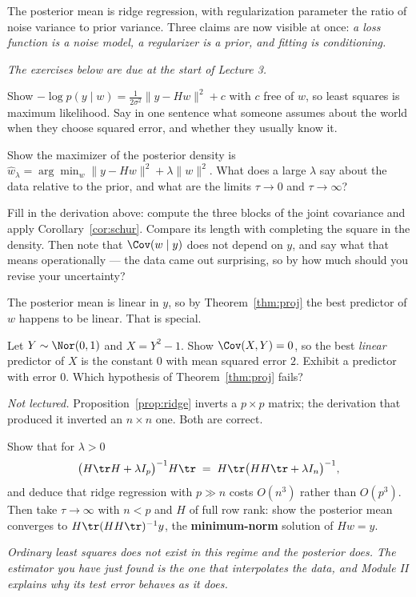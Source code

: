 \documentclass[11pt]{article}
\begin{document}
The posterior mean is ridge regression, with regularization parameter the ratio of noise variance to prior variance. Three claims are now visible at once: \emph{a loss function is a noise model, a regularizer is a prior, and fitting is conditioning.}

\emph{The exercises below are due at the start of Lecture 3.}

\begin{exercise}[\ty{A}]
Show $-\log p(y\mid w)=\frac{1}{2\sigma^2}\|y-Hw\|^2+c$ with $c$ free of $w$, so least squares is maximum likelihood. Say in one sentence what someone assumes about the world when they choose squared error, and whether they usually know it.
\end{exercise}

\begin{exercise}[\ty{A}]
Show the maximizer of the posterior density is $\widehat w_\lambda=\arg\min_w\|y-Hw\|^2+\lambda\|w\|^2$. What does a large $\lambda$ say about the data relative to the prior, and what are the limits $\tau\to0$ and $\tau\to\infty$?
\end{exercise}

\begin{exercise}[\ty{B}]
Fill in the derivation above: compute the three blocks of the joint covariance and apply Corollary~\ref{cor:schur}. Compare its length with completing the square in the density. Then note that $\Cov(w\mid y)$ does not depend on $y$, and say what that means operationally --- the data came out surprising, so by how much should you revise your uncertainty?
\end{exercise}

The posterior mean is linear in $y$, so by Theorem~\ref{thm:proj} the best predictor of $w$ happens to be linear. That is special.

\begin{exercise}[\ty{B}]
Let $Y\sim\Nor(0,1)$ and $X=Y^2-1$. Show $\Cov(X,Y)=0$, so the best \emph{linear} predictor of $X$ is the constant $0$ with mean squared error $2$. Exhibit a predictor with error $0$. Which hypothesis of Theorem~\ref{thm:proj} fails?
\end{exercise}


\emph{Not lectured.} Proposition~\ref{prop:ridge} inverts a $p\times p$ matrix; the derivation that produced it inverted an $n\times n$ one. Both are correct.

\begin{exercise}[\ty{C}]
Show that for $\lambda>0$
\[
\big(H\tr H+\lambda I_p\big)^{-1}H\tr\;=\;H\tr\big(HH\tr+\lambda I_n\big)^{-1},
\]
and deduce that ridge regression with $p\gg n$ costs $O(n^3)$ rather than $O(p^3)$. Then take $\tau\to\infty$ with $n<p$ and $H$ of full row rank: show the posterior mean converges to $H\tr(HH\tr)^{-1}y$, the \textbf{minimum-norm} solution of $Hw=y$.

\emph{Ordinary least squares does not exist in this regime and the posterior does. The estimator you have just found is the one that interpolates the data, and Module II explains why its test error behaves as it does.}
\end{exercise}
\end{document}
